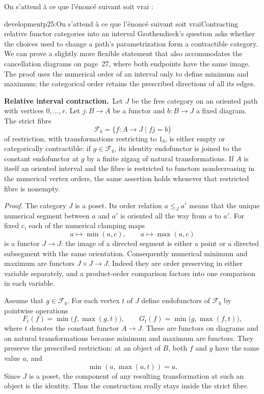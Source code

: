 On s'attend à ce que l'énoncé suivant soit vrai :

\begin{dcomment}{development}{p25:On s'attend à ce que l'énoncé suivant soit vrai}{Contracting relative functor categories into an interval}
Grothendieck's question asks whether the choices used to change a path's parametrization form a contractible category. We can prove a slightly more flexible statement that also accommodates the cancellation diagrams on page~27, where both endpoints have the same image. The proof uses the numerical order of an interval only to define minimum and maximum; the categorical order retains the prescribed directions of all its edges.

\textbf{Relative interval contraction.}\ours\ Let $J$ be the free category on an oriented path with vertices $0,\ldots,r$. Let $j:B\to A$ be a functor and $b:B\to J$ a fixed diagram. The strict fibre
\[
 \mathcal F_b=
 \{f:A\to J\mid fj=b\}
\]
of restriction, with transformations restricting to $1_b$, is either empty or categorically contractible: if $g\in\mathcal F_b$, its identity endofunctor is joined to the constant endofunctor at $g$ by a finite zigzag of natural transformations. If $A$ is itself an oriented interval and the fibre is restricted to functors nondecreasing in the numerical vertex orders, the same assertion holds whenever that restricted fibre is nonempty.

\emph{Proof.} The category $J$ is a poset. Its order relation $a\leq_J a'$ means that the unique numerical segment between $a$ and $a'$ is oriented all the way from $a$ to $a'$. For fixed $c$, each of the numerical clamping maps
\[
 a\longmapsto\min(a,c),\qquad
 a\longmapsto\max(a,c)
\]
is a functor $J\to J$: the image of a directed segment is either a point or a directed subsegment with the same orientation. Consequently numerical minimum and maximum are functors $J\times J\to J$. Indeed they are order preserving in either variable separately, and a product-order comparison factors into one comparison in each variable.

Assume that $g\in\mathcal F_b$. For each vertex $t$ of $J$ define endofunctors of $\mathcal F_b$ by pointwise operations
\[
 F_t(f)=\min\bigl(f,\max(g,t)\bigr),\qquad
 G_t(f)=\min\bigl(g,\max(f,t)\bigr),
\]
where $t$ denotes the constant functor $A\to J$. These are functors on diagrams and on natural transformations because minimum and maximum are functors. They preserve the prescribed restriction: at an object of $B$, both $f$ and $g$ have the same value $a$, and
\[
 \min(a,\max(a,t))=a.
\]
Since $J$ is a poset, the component of any resulting transformation at such an object is the identity. Thus the construction really stays inside the strict fibre.


\end{dcomment}
